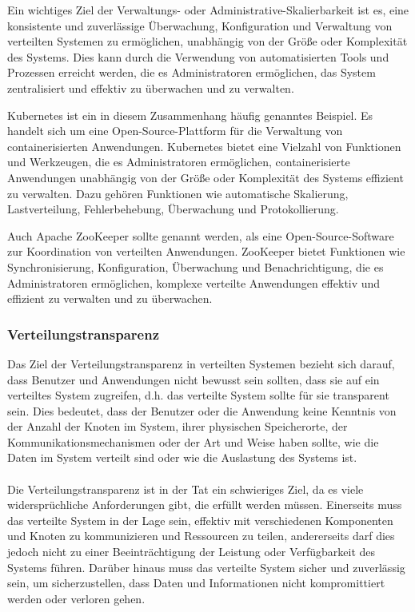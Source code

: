 \documentclass[../vs-script-first-v01.tex]{subfiles}
\begin{document}
\begin{itemize}
        Ein wichtiges Ziel der Verwaltungs- oder Administrative-Skalierbarkeit ist es, eine konsistente und zuverlässige Überwachung, Konfiguration und Verwaltung von verteilten Systemen zu ermöglichen, unabhängig von der Größe oder Komplexität des Systems. Dies kann durch die Verwendung von automatisierten Tools und Prozessen erreicht werden, die es Administratoren ermöglichen, das System zentralisiert und effektiv zu überwachen und zu verwalten.

        Kubernetes ist ein in diesem Zusammenhang häufig genanntes Beispiel. Es handelt sich um eine Open-Source-Plattform für die Verwaltung von containerisierten Anwendungen. Kubernetes bietet eine Vielzahl von Funktionen und Werkzeugen, die es Administratoren ermöglichen, containerisierte Anwendungen unabhängig von der Größe oder Komplexität des Systems effizient zu verwalten. Dazu gehören Funktionen wie automatische Skalierung, Lastverteilung, Fehlerbehebung, Überwachung und Protokollierung.

        Auch Apache ZooKeeper sollte genannt werden, als eine Open-Source-Software zur Koordination von verteilten Anwendungen. ZooKeeper bietet Funktionen wie Synchronisierung, Konfiguration, Überwachung und Benachrichtigung, die es Administratoren ermöglichen, komplexe verteilte Anwendungen effektiv und effizient zu verwalten und zu überwachen.
\end{itemize}

\subsubsection{Verteilungstransparenz}

Das Ziel der Verteilungstransparenz in verteilten Systemen bezieht sich darauf, dass Benutzer und Anwendungen nicht bewusst sein sollten, dass sie auf ein verteiltes System zugreifen, d.h. das verteilte System sollte für sie transparent sein. Dies bedeutet, dass der Benutzer oder die Anwendung keine Kenntnis von der Anzahl der Knoten im System, ihrer physischen Speicherorte, der Kommunikationsmechanismen oder der Art und Weise haben sollte, wie die Daten im System verteilt sind oder wie die Auslastung des Systems ist.
\\\\
Die Verteilungstransparenz ist in der Tat ein schwieriges Ziel, da es viele widersprüchliche Anforderungen gibt, die erfüllt werden müssen. Einerseits muss das verteilte System in der Lage sein, effektiv mit verschiedenen Komponenten und Knoten zu kommunizieren und Ressourcen zu teilen, andererseits darf dies jedoch nicht zu einer Beeinträchtigung der Leistung oder Verfügbarkeit des Systems führen. Darüber hinaus muss das verteilte System sicher und zuverlässig sein, um sicherzustellen, dass Daten und Informationen nicht kompromittiert werden oder verloren gehen.
\end{document}
